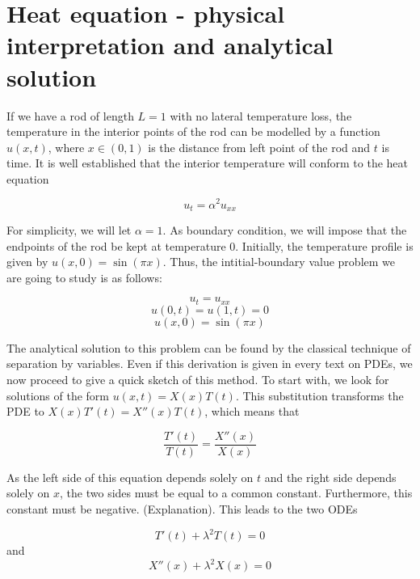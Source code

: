 \documentclass{article}
\begin{document}
\section{Heat equation - physical interpretation and analytical solution}
If we have a rod of length $L=1$ with no lateral temperature loss, the temperature in the interior points of the rod can be modelled by a function $u(x, t)$, where $x\in (0, 1)$ is the distance from left point of the rod and $t$ is time. It is well established that the interior temperature will conform to the heat equation

\begin{equation}
    u_t = \alpha^2 u_{xx}
\end{equation}

For simplicity, we will let $\alpha=1$. As boundary condition, we will impose that the endpoints of the rod be kept at temperature 0. Initially, the temperature profile is given by $u(x, 0) = \sin(\pi x)$. Thus, the intitial-boundary value problem we are going to study is as follows:

\begin{equation}
    u_t = u_{xx}
\end{equation}
\begin{equation}
    u(0, t) = u(1, t) = 0
\end{equation}
\begin{equation}
    u(x, 0) = \sin(\pi x)
\end{equation}

The analytical solution to this problem can be found by the classical technique of separation by variables. Even if this derivation is given in every text on PDEs, we now proceed to give a quick sketch of this method. To start with, we look for solutions of the form $u(x, t) = X(x) T(t)$. This substitution transforms the PDE to $X(x) T'(t) = X''(x) T(t)$, which means that

\begin{equation}
    \frac{T'(t)}{T(t)} = \frac{X''(x)}{X(x)}
\end{equation}

As the left side of this equation depends solely on $t$ and the right side depends solely on $x$, the two sides must be equal to a common constant. Furthermore, this constant must be negative. (Explanation). This leads to the two ODEs

\begin{equation}
    T'(t) + \lambda^2 T(t) = 0\label{eq:1}
\end{equation}
and
\begin{equation}
    X''(x) + \lambda^2 X(x) = 0\label{eq:2}
\end{equation}
\end{document}
